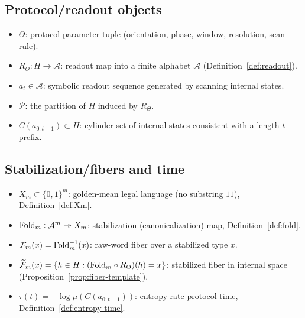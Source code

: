 \subsection{Protocol/readout objects}
\begin{itemize}[leftmargin=*,itemsep=2pt]
  \item $\Theta$: protocol parameter tuple (orientation, phase, window, resolution, scan rule).
  \item $R_\Theta:H\to\mathcal{A}$: readout map into a finite alphabet $\mathcal{A}$ (Definition~\ref{def:readout}).
  \item $a_t\in\mathcal{A}$: symbolic readout sequence generated by scanning internal states.
  \item $\mathcal{P}$: the partition of $H$ induced by $R_\Theta$.
  \item $C(a_{0:t-1})\subset H$: cylinder set of internal states consistent with a length-$t$ prefix.
\end{itemize}

\subsection{Stabilization/fibers and time}
\begin{itemize}[leftmargin=*,itemsep=2pt]
  \item $X_m\subset\{0,1\}^m$: golden-mean legal language (no substring $11$), Definition~\ref{def:Xm}.
  \item $\mathrm{Fold}_m:\mathcal{A}^m\twoheadrightarrow X_m$: stabilization (canonicalization) map, Definition~\ref{def:fold}.
  \item $\mathcal{F}_m(x)=\mathrm{Fold}_m^{-1}(x)$: raw-word fiber over a stabilized type $x$.
  \item $\widetilde{\mathcal{F}}_m(x)=\{h\in H:(\mathrm{Fold}_m\circ R_\Theta)(h)=x\}$: stabilized fiber in internal space (Proposition~\ref{prop:fiber-template}).
  \item $\tau(t)=-\log\mu(C(a_{0:t-1}))$: entropy-rate protocol time, Definition~\ref{def:entropy-time}.
\end{itemize}

